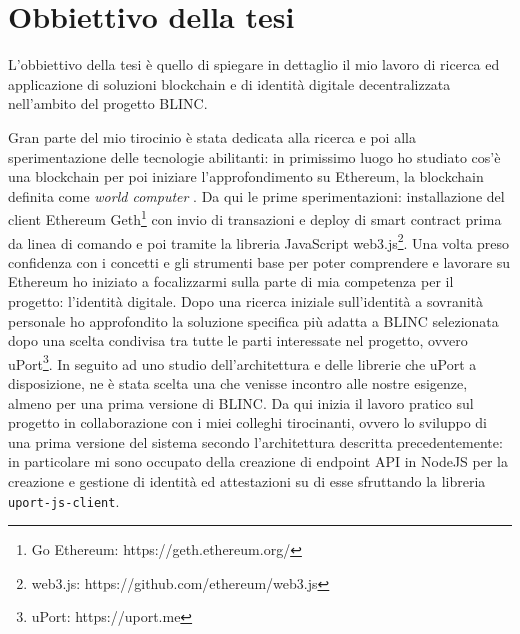 \section{Obbiettivo della tesi}

L'obbiettivo della tesi è quello di spiegare in dettaglio il mio lavoro di ricerca ed applicazione
di soluzioni blockchain e di identità digitale decentralizzata nell'ambito del progetto BLINC.

Gran parte del mio tirocinio è stata dedicata alla ricerca e poi alla sperimentazione delle tecnologie
abilitanti: in primissimo luogo ho studiato cos'è una blockchain \cite{WEBSITE:4} per poi iniziare l'approfondimento
su Ethereum, la blockchain definita come \emph{world computer} \cite{WEBSITE:5}. 
Da qui le prime sperimentazioni: installazione del client Ethereum 
Geth\footnote{Go Ethereum: https://geth.ethereum.org/} con invio di transazioni e deploy di smart contract
prima da linea di comando e poi tramite la libreria JavaScript 
web3.js\footnote{web3.js: https://github.com/ethereum/web3.js}.
Una volta preso confidenza con i concetti e gli strumenti base per poter comprendere e lavorare su
Ethereum ho iniziato a focalizzarmi sulla parte di mia competenza per il progetto: l'identità digitale.
Dopo una ricerca iniziale sull'identità a sovranità personale ho approfondito la soluzione specifica
più adatta a BLINC selezionata dopo una scelta condivisa tra tutte le parti interessate nel progetto, ovvero
uPort\footnote{uPort: https://uport.me}.
In seguito ad uno studio dell'architettura e delle librerie che uPort a disposizione, ne è stata
scelta una che venisse incontro alle nostre esigenze, almeno per una prima versione di BLINC.
Da qui inizia il lavoro pratico sul progetto in collaborazione con i miei colleghi tirocinanti,
ovvero lo sviluppo di una prima versione del sistema secondo l'architettura descritta precedentemente:
in particolare mi sono occupato della creazione di endpoint API in NodeJS per la creazione e gestione
di identità ed attestazioni su di esse sfruttando la libreria \texttt{uport-js-client}.